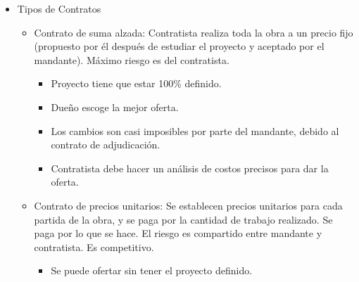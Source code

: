 \documentclass{article} %
\begin{document}
\begin{itemize}[label={},left=0pt,align=parleft]
\begin{itemize}[label={},left=1em,align=parleft]
\begin{itemize}[label={},left=2em,align=parleft]
        \end{itemize}
    \end{itemize}
    \item \begin{highlightbox}[levelone] Tipos de Contratos \end{highlightbox}
    \begin{itemize}[label={},left=1em,align=parleft]
        \item \begin{highlightbox}[leveltwo] Contrato de suma alzada: Contratista realiza toda la obra a un precio fijo (propuesto por él después de estudiar el proyecto y aceptado por el mandante). Máximo riesgo es del contratista. \end{highlightbox}
        \begin{itemize}[label={},left=2em,align=parleft]
            \item \begin{highlightbox}[levelthree] Proyecto tiene que estar 100\% definido. \end{highlightbox}
            \item \begin{highlightbox}[levelthree] Dueño escoge la mejor oferta. \end{highlightbox}
            \item \begin{highlightbox}[levelthree] Los cambios son casi imposibles por parte del mandante, debido al contrato de adjudicación. \end{highlightbox}
            \item \begin{highlightbox}[levelthree] Contratista debe hacer un análisis de costos precisos para dar la oferta. \end{highlightbox}
        \end{itemize}
        \item \begin{highlightbox}[leveltwo] Contrato de precios unitarios: Se establecen precios unitarios para cada partida de la obra, y se paga por la cantidad de trabajo realizado. Se paga por lo que se hace. El riesgo es compartido entre mandante y contratista. Es competitivo. \end{highlightbox}
        \begin{itemize}[label={},left=2em,align=parleft]
            \item \begin{highlightbox}[levelthree] Se puede ofertar sin tener el proyecto definido. \end{highlightbox}

\end{itemize}
\end{itemize}
\end{itemize}
\end{document}

